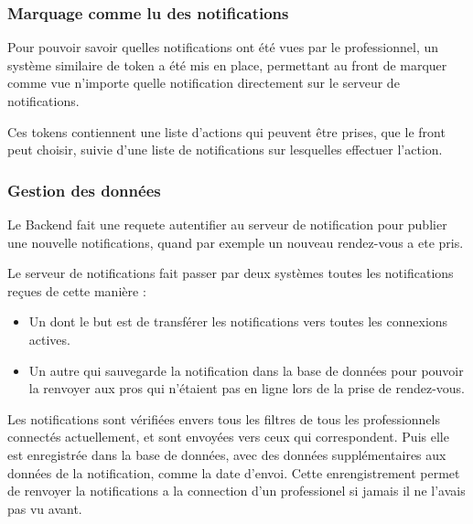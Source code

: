 \subsubsection{Marquage comme lu des notifications}

Pour pouvoir savoir quelles notifications ont été vues par le professionnel,
un système similaire de token a été mis en place, permettant au front de
marquer comme vue n'importe quelle notification directement sur le serveur de
notifications.

Ces tokens contiennent une liste d'actions qui peuvent être prises, que le
front peut choisir, suivie d'une liste de notifications sur lesquelles effectuer
l'action.

\subsubsection{Gestion des données}

Le Backend fait une requete autentifier au serveur de notification pour publier
une nouvelle notifications, quand par exemple un nouveau rendez-vous a ete pris.

Le serveur de notifications fait passer par deux systèmes toutes les
notifications reçues de cette manière :

\begin{itemize}
	\item Un dont le but est de transférer les notifications vers toutes les
connexions actives.
	\item Un autre qui sauvegarde la notification dans la base de données pour pouvoir la
renvoyer aux pros qui n'étaient pas en ligne lors de la prise de rendez-vous.
\end{itemize}

Les notifications sont vérifiées envers tous les filtres de tous les
professionnels connectés actuellement, et sont envoyées vers ceux qui
correspondent. Puis elle est enregistrée dans la base de données, avec des
données supplémentaires aux données de la notification, comme la date d'envoi.
Cette enrengistrement permet de renvoyer la notifications a la connection d'un
professionel si jamais il ne l'avais pas vu avant.
